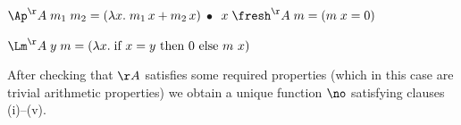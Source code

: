\begin{exa}
\begin{myitem}
	\item $\Ap^\AA\;m_1\;m_2 = (\lambda x.\;m_1\,x + m_2\,x)$
	\hspace*{8.45ex}
	$\bullet\;$ $x\;\fresh^\AA\;m = (m\;x = 0)$
	
	\item $\Lm^\AA\;y\;m = (\lambda x.\;\mbox{if $x = y$ then $0$ else $m\ x$)}$
	
	
	
	
	

	
\end{myitem} 
%
After checking that $\AA$ satisfies some required properties (which in this case are trivial arithmetic properties) %
we obtain a unique function $\no$ satisfying clauses (i)--(v). 


%


%

\end{exa} 





